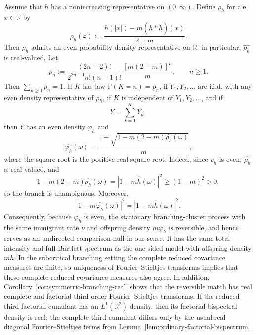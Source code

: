 \documentclass[aap,press]{apt} \volno{00} \partno{00}
\newcommand{\PP}{\mathbb{P}}
\newcommand{\R}{\mathbb{R}}
\newcommand{\1}{\mathbf{1}}
\numberwithin{equation}{section}
\begin{document}
\begin{thm}\label{thm:monotone-match}
Assume that $h$ has a nonincreasing representative on $(0,\infty)$. Define $\rho_h$ for a.e. $x\in\mathbb{R}$ by
\begin{equation}\label{eq:rho-h-def}
\rho_h(x):=\frac{h(|x|)-m(h*\check h)(x)}{2-m}.
\end{equation}
Then $\rho_h$ admits an even probability-density representative on $\mathbb{R}$; in particular, $\widehat{\rho_h}$ is real-valued. Let
\begin{equation}\label{eq:pn-def}
p_n:=\frac{(2n-2)!}{2^{2n-1}n!(n-1)!}\,\frac{[m(2-m)]^n}{m},\qquad n\ge1.
\end{equation}
Then $\sum_{n\ge1}p_n=1$. If $K$ has law $\PP(K=n)=p_n$, if $Y_1,Y_2,\ldots$ are i.i.d. with any even density representative of $\rho_h$, if $K$ is independent of $Y_1,Y_2,\ldots$, and if
\[
Y=\sum_{k=1}^K Y_k,
\]
then $Y$ has an even density $\varphi_h$ and
\begin{equation}\label{eq:varphi-transform}
\widehat{\varphi_h}(\omega)=\frac{1-\sqrt{1-m(2-m)\widehat{\rho_h}(\omega)}}{m},
\end{equation}
where the square root is the positive real square root. Indeed, since $\rho_h$ is even, $\widehat{\rho_h}$ is real-valued, and
\[
1-m(2-m)\widehat{\rho_h}(\omega)
=
|1-m\widehat h(\omega)|^2
\ge (1-m)^2>0,
\]
so the branch is unambiguous. Moreover,
\begin{equation}\label{eq:spectral-match}
|1-m\widehat{\varphi_h}(\omega)|^2=|1-m\widehat h(\omega)|^2.
\end{equation}
Consequently, because $\varphi_h$ is even, the stationary branching-cluster process with the same immigrant rate $\nu$ and offspring density $m\varphi_h$ is reversible, and hence serves as an undirected comparison null in our sense. It has the same total intensity and full Bartlett spectrum as the one-sided model with offspring density $mh$. In the subcritical branching setting the complete reduced covariance measures are finite, so uniqueness of Fourier--Stieltjes transforms implies that these complete reduced covariance measures also agree. In addition, Corollary~\ref{cor:symmetric-branching-real} shows that the reversible match has real complete and factorial third-order Fourier--Stieltjes transforms. If the reduced third factorial cumulant has an $L^1(\R^2)$ density, then its factorial bispectral density is real; the complete third cumulant differs only by the usual real diagonal Fourier--Stieltjes terms from Lemma~\ref{lem:ordinary-factorial-bispectrum}.
\end{thm}
\end{document}
